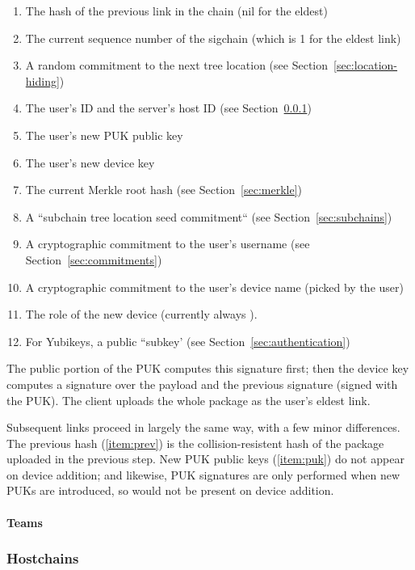 \begin{enumerate}\itemsep0em
    \item \label{item:prev} The hash of the previous link in the chain (nil for the eldest)
    \item The current sequence number of the sigchain (which is 1 for the eldest link)
    \item A random commitment to the next tree location (see Section~\ref{sec:location-hiding})
    \item The user's ID and the server's host ID (see Section~\ref{sec:hostchains})
    \item \label{item:puk} The user's new PUK public key
    \item The user's new device key
    \item The current Merkle root hash (see Section~\ref{sec:merkle})
    \item A ``subchain tree location seed commitment`` (see Section~\ref{sec:subchains})
    \item A cryptographic commitment to the user's username (see Section~\ref{sec:commitments})
    \item A cryptographic commitment to the user's device name (picked by the user)
    \item The role of the new device (currently always \owner ).
    \item For Yubikeys, a public ``subkey' (see Section~\ref{sec:authentication})
\end{enumerate}

The public portion of the PUK computes this signature first; then the device key
computes a signature over the payload and the previous signature (signed with
the PUK). The client uploads the whole package as the user's eldest link.

Subsequent links proceed in largely the same way, with a few minor differences.
The previous hash (\ref{item:prev}) is the collision-resistent hash of the 
package uploaded in the previous step. New PUK public keys (\ref{item:puk}) do
not appear on device addition; and likewise, PUK signatures are only performed when
new PUKs are introduced, so would not be present on device addition.

\paragraph{Teams} 


\subsubsection{Hostchains}
\label{sec:hostchains}

